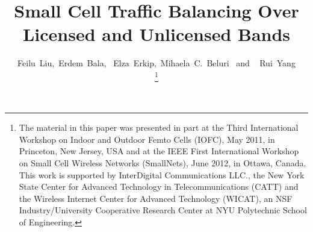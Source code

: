 \documentclass[journal,final,letterpaper,10pt,doublecolumn,twoside]{IEEEtran}
\begin{document}
\title{Small Cell Traffic Balancing Over Licensed and Unlicensed Bands}


\author{Feilu~Liu,~Erdem~Bala,~
        Elza~Erkip,~Mihaela~C.~Beluri~ and ~ Rui~Yang

\thanks{
The material in this paper was presented in part at the  Third
International Workshop on Indoor and Outdoor Femto Cells (IOFC), May
2011, in Princeton, New Jersey, USA and at the IEEE First
International Workshop on Small Cell Wireless Networks (SmallNets),
June 2012, in Ottawa, Canada. This work is supported by InterDigital
Communications LLC., the New York State Center for Advanced
Technology in Telecommunications (CATT) and the Wireless Internet
Center for Advanced Technology (WICAT), an NSF Industry/University
Cooperative Research Center at NYU Polytechnic School of Engineering. } }


\maketitle
\end{document}
